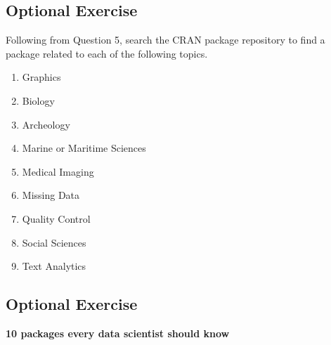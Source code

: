 \documentclass[12pt]{article}
\begin{document}
\subsection*{Optional Exercise}
Following from Question 5, search the CRAN package repository to find a package 
related to each of the following topics.
\begin{enumerate}
\item Graphics
\item Biology
\item Archeology
\item Marine or Maritime Sciences
\item Medical Imaging
\item Missing Data
\item Quality Control
\item Social Sciences
\item Text Analytics
\end{enumerate}

\newpage
\subsection*{Optional Exercise}

\textbf{10 packages every data scientist should know}
\end{document}
